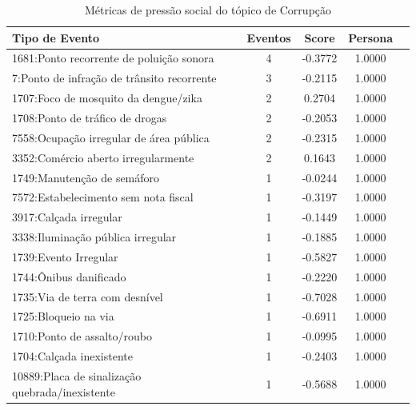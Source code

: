 \begin{table}[htbp]
	\centering
	\caption{Métricas de pressão social do tópico de Corrupção}
	\label{tab:eventos_populares_corruption}
	\begin{tabular}{|l|c|c|c|c|}
		\hline
		\textbf{Tipo de Evento}                         & \textbf{Eventos} & \textbf{Score} & \textbf{Persona} \\
		\hline
		1681:Ponto recorrente de poluição sonora        & 4                & -0.3772        & 1.0000           \\
		\hline
		7:Ponto de infração de trânsito recorrente      & 3                & -0.2115        & 1.0000           \\
		\hline
		1707:Foco de mosquito da dengue/zika            & 2                & 0.2704         & 1.0000           \\
		\hline
		1708:Ponto de tráfico de drogas                 & 2                & -0.2053        & 1.0000           \\
		\hline
		7558:Ocupação irregular de área pública         & 2                & -0.2315        & 1.0000           \\
		\hline
		3352:Comércio aberto irregularmente             & 2                & 0.1643         & 1.0000           \\
		\hline
		1749:Manutenção de semáforo                     & 1                & -0.0244        & 1.0000           \\
		\hline
		7572:Estabelecimento sem nota fiscal            & 1                & -0.3197        & 1.0000           \\
		\hline
		3917:Calçada irregular                          & 1                & -0.1449        & 1.0000           \\
		\hline
		3338:Iluminação pública irregular               & 1                & -0.1885        & 1.0000           \\
		\hline
		1739:Evento Irregular                           & 1                & -0.5827        & 1.0000           \\
		\hline
		1744:Ônibus danificado                          & 1                & -0.2220        & 1.0000           \\
		\hline
		1735:Via de terra com desnível                  & 1                & -0.7028        & 1.0000           \\
		\hline
		1725:Bloqueio na via                            & 1                & -0.6911        & 1.0000           \\
		\hline
		1710:Ponto de assalto/roubo                     & 1                & -0.0995        & 1.0000           \\
		\hline
		1704:Calçada inexistente                        & 1                & -0.2403        & 1.0000           \\
		\hline
		10889:Placa de sinalização quebrada/inexistente & 1                & -0.5688        & 1.0000           \\
		\hline
	\end{tabular}
\end{table}

